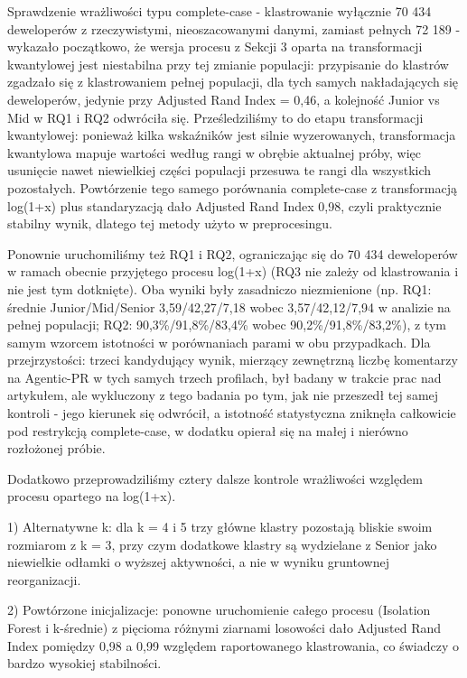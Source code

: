 Sprawdzenie wrażliwości typu complete-case - klastrowanie wyłącznie 70 434 deweloperów z rzeczywistymi, nieoszacowanymi danymi, zamiast pełnych 72 189 - wykazało początkowo, że wersja procesu z Sekcji 3 oparta na transformacji kwantylowej jest niestabilna przy tej zmianie populacji: przypisanie do klastrów zgadzało się z klastrowaniem pełnej populacji, dla tych samych nakładających się deweloperów, jedynie przy Adjusted Rand Index = 0,46, a kolejność Junior vs Mid w RQ1 i RQ2 odwróciła się. Prześledziliśmy to do etapu transformacji kwantylowej: ponieważ kilka wskaźników jest silnie wyzerowanych, transformacja kwantylowa mapuje wartości według rangi w obrębie aktualnej próby, więc usunięcie nawet niewielkiej części populacji przesuwa te rangi dla wszystkich pozostałych. Powtórzenie tego samego porównania complete-case z transformacją log(1+x) plus standaryzacją dało Adjusted Rand Index 0,98, czyli praktycznie stabilny wynik, dlatego tej metody użyto w preprocesingu.

Ponownie uruchomiliśmy też RQ1 i RQ2, ograniczając się do 70 434 deweloperów w ramach obecnie przyjętego procesu log(1+x) (RQ3 nie zależy od klastrowania i nie jest tym dotknięte). Oba wyniki były zasadniczo niezmienione (np. RQ1: średnie Junior/Mid/Senior 3,59/42,27/7,18 wobec 3,57/42,12/7,94 w analizie na pełnej populacji; RQ2: 90,3\%/91,8\%/83,4\% wobec 90,2\%/91,8\%/83,2\%), z tym samym wzorcem istotności w porównaniach parami w obu przypadkach. Dla przejrzystości: trzeci kandydujący wynik, mierzący zewnętrzną liczbę komentarzy na Agentic-PR w tych samych trzech profilach, był badany w trakcie prac nad artykułem, ale wykluczony z tego badania po tym, jak nie przeszedł tej samej kontroli - jego kierunek się odwrócił, a istotność statystyczna zniknęła całkowicie pod restrykcją complete-case, w dodatku opierał się na małej i nierówno rozłożonej próbie.

Dodatkowo przeprowadziliśmy cztery dalsze kontrole wrażliwości względem procesu opartego na log(1+x).

1) Alternatywne k: dla k = 4 i 5 trzy główne klastry pozostają bliskie swoim rozmiarom z k = 3, przy czym dodatkowe klastry są wydzielane z Senior jako niewielkie odłamki o wyższej aktywności, a nie w wyniku gruntownej reorganizacji.

2) Powtórzone inicjalizacje: ponowne uruchomienie całego procesu (Isolation Forest i k-średnie) z pięcioma różnymi ziarnami losowości dało Adjusted Rand Index pomiędzy 0,98 a 0,99 względem raportowanego klastrowania, co świadczy o bardzo wysokiej stabilności.

